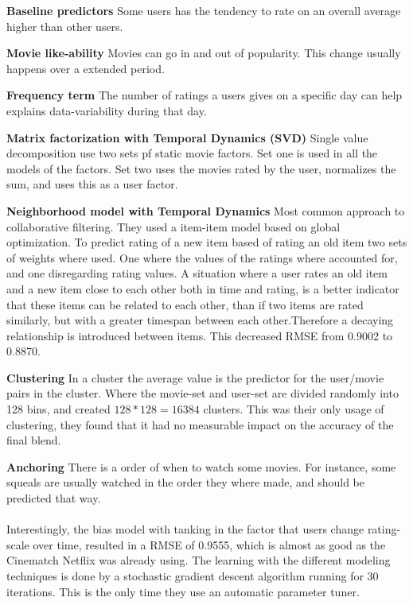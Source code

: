 \textbf{Baseline predictors}  Some users has the tendency to rate on an overall average higher than other users.

\textbf{Movie like-ability}  Movies can go in and out of popularity. This change usually happens over a extended period.

\textbf{Frequency term}  The number of ratings a users gives on a specific day can help explains data-variability during that day.

\textbf{Matrix factorization with Temporal Dynamics (SVD)}  Single value decomposition use two sets pf static movie factors. Set one is used in all the models of the factors. Set two uses the movies rated by the user, normalizes the sum, and uses this as a user factor.

\textbf{Neighborhood model with Temporal Dynamics}  Most common approach to collaborative filtering. They used a item-item model based on global optimization. To predict rating of a new item based of rating an old item two sets of weights where used. One where the values of the ratings where accounted for, and one disregarding rating values.
A situation where a user rates an old item and a new item close to each other both in time and rating, is a better indicator that these items can be related to each other, than if two items are rated similarly, but with a greater timespan between each other.Therefore a decaying relationship is introduced between items. This decreased RMSE from 0.9002 to 0.8870.\cite{BellKor-CF-TD}

\textbf{Clustering}  In a cluster the average value is the predictor for the user/movie pairs in the cluster. Where the movie-set and user-set are divided randomly into 128 bins, and created $128*128=16384$ clusters. This was their only usage of clustering, they found that it had no measurable impact on the accuracy of the final blend\cite{pragmatictheory-sol}.

\textbf{Anchoring}  There is a order of when to watch some movies. For instance, some squeals are usually watched in the order they where made, and should be predicted that way. \\\\


Interestingly, the bias model with tanking in the factor that users change rating-scale over time, resulted in a RMSE of 0.9555, which is almost as good as the Cinematch Netflix was already using. The learning with the different modeling techniques is done by a stochastic gradient descent algorithm running for 30 iterations. This is the only time they use an automatic parameter tuner. \cite{BellKor-2008-sol}

